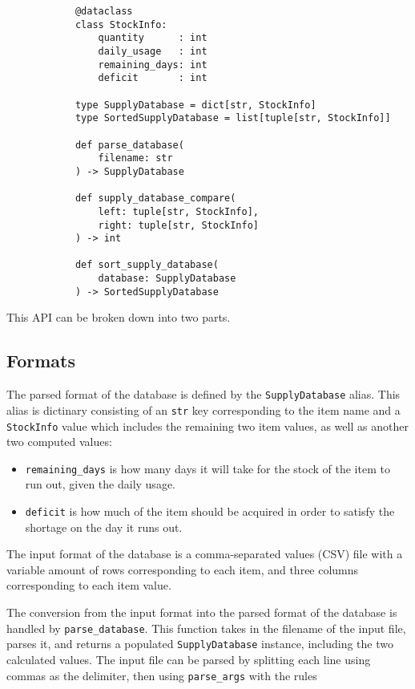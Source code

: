 \documentclass{article}
\begin{document}
		\begin{verbatim}
			@dataclass
			class StockInfo:
				quantity      : int
				daily_usage   : int
				remaining_days: int
				deficit       : int

			type SupplyDatabase = dict[str, StockInfo]
			type SortedSupplyDatabase = list[tuple[str, StockInfo]]

			def parse_database(
				filename: str
			) -> SupplyDatabase

			def supply_database_compare(
				left: tuple[str, StockInfo],
				right: tuple[str, StockInfo]
			) -> int

			def sort_supply_database(
				database: SupplyDatabase
			) -> SortedSupplyDatabase
		\end{verbatim}

		This API can be broken down into two parts.

		\subsection{Formats}
			The parsed format of the database is defined by the \verb|SupplyDatabase| alias. This
			alias is dictinary consisting of an \verb|str| key corresponding to the item name and a
			\verb|StockInfo| value which includes the remaining two item values, as well as another
			two computed values:

			\begin{itemize}
				\item \verb|remaining_days| is how many days it will take for the stock of the item
				to run out, given the daily usage.
				\item \verb|deficit| is how much of the item should be acquired in order to satisfy
				the shortage on the day it runs out.
			\end{itemize}

			The input format of the database is a comma-separated values (CSV) file with a variable
			amount of rows corresponding to each item, and three columns corresponding to each item
			value.

			The conversion from the input format into the parsed format of the database is handled
			by \verb|parse_database|. This function takes in the filename of the input file, parses
			it, and returns a populated \verb|SupplyDatabase| instance, including the two
			calculated values. The input file can be parsed by splitting each line using commas as
			the delimiter, then using \verb|parse_args| with the rules
\end{document}
